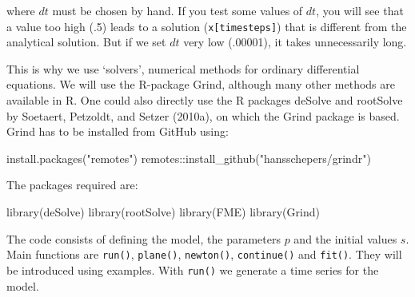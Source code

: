 \documentclass[
  a4paper,
  DIV=11,
  numbers=noendperiod,
  oneside]{scrreprt}
\newenvironment{Shaded}{\begin{snugshade}}{\end{snugshade}}
\newcommand{\FunctionTok}[1]{\textcolor[rgb]{0.28,0.35,0.67}{#1}}
\newcommand{\NormalTok}[1]{\textcolor[rgb]{0.00,0.23,0.31}{#1}}
\newcommand{\SpecialCharTok}[1]{\textcolor[rgb]{0.37,0.37,0.37}{#1}}
\newcommand{\StringTok}[1]{\textcolor[rgb]{0.13,0.47,0.30}{#1}}
\begin{document}
where \(dt\) must be chosen by hand. If you test some values of \(dt\),
you will see that a value too high (.5) leads to a solution
(\texttt{x{[}timesteps{]}}) that is different from the analytical
solution. But if we set \(dt\) very low (.00001), it takes unnecessarily
long.

This is why we use `solvers', numerical methods for ordinary
differential equations. We will use the R-package Grind, although many
other methods are available in R. One could also directly use the R
packages deSolve and rootSolve by Soetaert, Petzoldt, and Setzer
(2010a), on which the Grind package is based. Grind has to be installed
from GitHub using:

\begin{Shaded}
\begin{Highlighting}[]
\FunctionTok{install.packages}\NormalTok{(}\StringTok{"remotes"}\NormalTok{)}
\NormalTok{remotes}\SpecialCharTok{::}\FunctionTok{install\_github}\NormalTok{(}\StringTok{"hansschepers/grindr"}\NormalTok{)}
\end{Highlighting}
\end{Shaded}

The packages required are:

\begin{Shaded}
\begin{Highlighting}[]
\FunctionTok{library}\NormalTok{(deSolve)}
\FunctionTok{library}\NormalTok{(rootSolve)}
\FunctionTok{library}\NormalTok{(FME)}
\FunctionTok{library}\NormalTok{(Grind)}
\end{Highlighting}
\end{Shaded}

The code consists of defining the model, the parameters \(p\) and the
initial values \(s\). Main functions are \texttt{run()},
\texttt{plane()}, \texttt{newton()}, \texttt{continue()} and
\texttt{fit()}. They will be introduced using examples. With
\texttt{run()} we generate a time series for the model.
\end{document}
